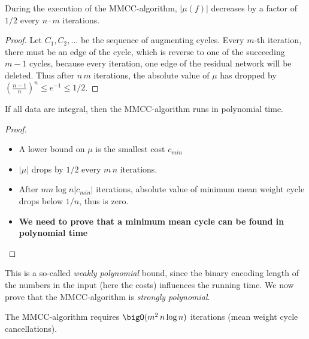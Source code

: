 





  \begin{corollary}
    \label{co:4}
    During the execution of the MMCC-algorithm, $|\mu(f)|$ decreases by
    a factor of $1/2$ every $n\cdot m$ iterations. 
  \end{corollary}

  \begin{proof}
    Let $C_1, C_2,\ldots$ be the sequence of augmenting cycles. Every
    $m$-th iteration, there must be an edge of the cycle, which is
    reverse to one of the succeeding $m-1$ cycles, because every
    iteration, one edge of the residual network will be deleted. 
    Thus after $n \, m$ iterations, the absolute value of $\mu$ has
    dropped by $\left(\frac{n-1}{n} \right)^n \leq e^{-1} \leq 1/2$. 
  \end{proof}

  \begin{corollary}
    \label{co:5}
    If all data are integral, then the
    MMCC-algorithm runs in polynomial time. 
  \end{corollary}
  
  \begin{proof}
    \begin{itemize}
    \item A lower bound on $\mu$ is the smallest cost $c_{min}$
    \item $|\mu|$ drops by $1/2$ every $m \, n$ iterations. 
    \item After $m n \log n |c_{min}|$ iterations, absolute value
    of minimum mean weight cycle   drops below $1/n$, thus is zero.
    \item {\bf We need to prove that a minimum mean cycle can be found        in polynomial time} 
    \end{itemize}
  \end{proof}


This is a so-called \emph{weakly polynomial} bound, since the binary
encoding length of the numbers in the input (here the costs)
influences the running time. We now prove that the MMCC-algorithm is
\emph{strongly polynomial}. 






\begin{theorem}
  The MMCC-algorithm requires  $\bigO(m^2 \, n \log n)$ iterations
  (mean weight cycle cancellations). 
\end{theorem}

